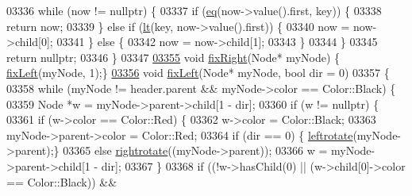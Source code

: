 \begin{DoxyCode}
03336             \textcolor{keywordflow}{while} (now != \textcolor{keyword}{nullptr}) \{
03337                 \textcolor{keywordflow}{if} (\hyperlink{classaed2_1_1map_ab45cb28bb215cd229383d88b96b3f624_ab45cb28bb215cd229383d88b96b3f624}{eq}(now->value().first, key)) \{
03338                     \textcolor{keywordflow}{return} now;
03339                 \} \textcolor{keywordflow}{else} \textcolor{keywordflow}{if} (\hyperlink{classaed2_1_1map_a0e5be36fae0693e4665bd2a615e7550a_a0e5be36fae0693e4665bd2a615e7550a}{lt}(key, now->value().first)) \{
03340                     now = now->child[0];
03341                 \} \textcolor{keywordflow}{else} \{
03342                     now = now->child[1];
03343                 \}
03344             \}
03345             \textcolor{keywordflow}{return} \textcolor{keyword}{nullptr};
03346         \}
03347 
\hypertarget{map_8h_source.tex_l03355}{}\hyperlink{classaed2_1_1map_ae908761d06411046290cf49a5e0618bd_ae908761d06411046290cf49a5e0618bd}{03355}         \textcolor{keywordtype}{void} \hyperlink{classaed2_1_1map_ae908761d06411046290cf49a5e0618bd_ae908761d06411046290cf49a5e0618bd}{fixRight}(Node* myNode) \{ \hyperlink{classaed2_1_1map_ae69c26a9d27f538124cd827646e56feb_ae69c26a9d27f538124cd827646e56feb}{fixLeft}(myNode, 1);\}
\hypertarget{map_8h_source.tex_l03356}{}\hyperlink{classaed2_1_1map_ae69c26a9d27f538124cd827646e56feb_ae69c26a9d27f538124cd827646e56feb}{03356}         \textcolor{keywordtype}{void} \hyperlink{classaed2_1_1map_ae69c26a9d27f538124cd827646e56feb_ae69c26a9d27f538124cd827646e56feb}{fixLeft}(Node* myNode, \textcolor{keywordtype}{bool} dir = 0)
03357         \{
03358             \textcolor{keywordflow}{while} (myNode != header.parent && myNode->color == Color::Black) \{
03359                 Node *w = myNode->parent->child[1 - dir];
03360                 \textcolor{keywordflow}{if} (w != \textcolor{keyword}{nullptr}) \{
03361                     \textcolor{keywordflow}{if} (w->color == Color::Red) \{
03362                         w->color = Color::Black;
03363                         myNode->parent->color = Color::Red;
03364                         \textcolor{keywordflow}{if} (dir == 0) \{ \hyperlink{classaed2_1_1map_ad764851f1534f2db0964c4f729056a1e_ad764851f1534f2db0964c4f729056a1e}{leftrotate}(myNode->parent);\}
03365                         \textcolor{keywordflow}{else} \hyperlink{classaed2_1_1map_a816d69fa4dfe18a984dc3628fee14e2f_a816d69fa4dfe18a984dc3628fee14e2f}{rightrotate}((myNode->parent));
03366                         w = myNode->parent->child[1 - dir];
03367                     \}
03368                     \textcolor{keywordflow}{if} ((!w->hasChild(0) || (w->child[0]->color == Color::Black)) &&

\end{DoxyCode}
